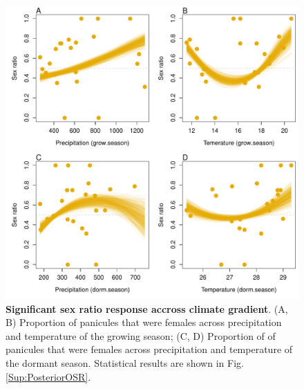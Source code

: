 \documentclass[12pt]{article}
\begin{document}
\begin{figure}[H]
  \begin{center}
    \includegraphics[width=0.80\linewidth]{Figures/gardens_OSR.pdf}
  \caption{\textbf{Significant sex ratio response accross climate gradient}.
  (A, B) Proportion of panicules that were females across precipitation and temperature of the growing season; (C, D) Proportion of of panicules that were females across precipitation and temperature of the dormant season.
  Statistical results are shown in Fig. \ref{Sup:PosteriorOSR}.}
  \label{Sup:gardens_OSR}
  \end{center}
\end{figure}
\end{document}
